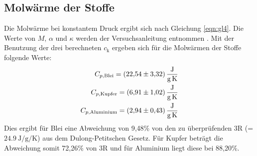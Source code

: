 \subsection{Molwärme der Stoffe}
\label{sec:Molwärme}
Die Molwärme bei konstantem Druck ergibt sich nach Gleichung \eqref{eqn:gl4}.
Die Werte von $M$, $\alpha$ und $\kappa$ werden der Versuchsanleitung entnommen \cite{V201}.
Mit der Benutzung der drei berechneten $c_\text{k}$ ergeben sich für die Molwärmen der Stoffe folgende Werte:
\begin{align*}
  C_{p,\text{Blei}} = \SI{22,54 \pm 3.32}{\joule\per\gram\per\kelvin}\\
  C_{p,\text{Kupfer}} = \SI{6,91 \pm 1,02}{\joule\per\gram\per\kelvin}\\
  C_{p,\text{Aluminium}} = \SI{2,94 \pm 0,43}{\joule\per\gram\per\kelvin}
\end{align*}
Dies ergibt für Blei eine Abweichung von 9,48\% von den zu überprüfenden 3R (= $\SI{24,9}{\joule\per\gram\per\kelvin}$) aus dem Dulong-Petitschen Gesetz.
Für Kupfer beträgt die Abweichung somit 72,26\% von 3R und für Aluminium liegt diese bei 88,20\%.
